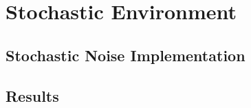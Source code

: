     \newpage
    \section{Stochastic Environment}
    \label{results:stochastic}
        
        \subsection{Stochastic Noise Implementation}
        
        \subsection{Results}
